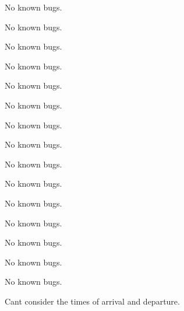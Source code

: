 
\begin{DoxyRefList}
\item[File \mbox{\hyperlink{airline_8c}{airline.c}} ]\label{bug__bug000001}%
%
No known bugs.  
\item[File \mbox{\hyperlink{airline_8h}{airline.h}} ]\label{bug__bug000002}%
%
No known bugs.  
\item[File \mbox{\hyperlink{airport_8c}{airport.c}} ]\label{bug__bug000003}%
%
No known bugs.  
\item[File \mbox{\hyperlink{airport_8h}{airport.h}} ]\label{bug__bug000004}%
%
No known bugs.  
\item[File \mbox{\hyperlink{flight_8c}{flight.c}} ]\label{bug__bug000005}%
%
No known bugs.  
\item[File \mbox{\hyperlink{flight_8h}{flight.h}} ]\label{bug__bug000006}%
%
No known bugs.  
\item[File \mbox{\hyperlink{list_8h}{list.h}} ]\label{bug__bug000007}%
%
No known bugs.  
\item[File \mbox{\hyperlink{listArrayList_8c}{list\+Array\+List.c}} ]\label{bug__bug000008}%
%
No known bugs.  
\item[File \mbox{\hyperlink{map_8h}{map.h}} ]\label{bug__bug000009}%
%
No known bugs.  
\item[File \mbox{\hyperlink{mapArrayList_8c}{map\+Array\+List.c}} ]\label{bug__bug000010}%
%
No known bugs.  
\item[File \mbox{\hyperlink{mapElem_8c}{map\+Elem.c}} ]\label{bug__bug000011}%
%
No known bugs.  
\item[File \mbox{\hyperlink{mapElem_8h}{map\+Elem.h}} ]\label{bug__bug000012}%
%
No known bugs.  
\item[File \mbox{\hyperlink{mapLinkedList_8c}{map\+Linked\+List.c}} ]\label{bug__bug000013}%
%
No known bugs.  
\item[File \mbox{\hyperlink{projectMethods_8c}{project\+Methods.c}} ]\label{bug__bug000014}%
%
No known bugs.  
\item[File \mbox{\hyperlink{projectMethods_8h}{project\+Methods.h}} ]\label{bug__bug000015}%
%
No known bugs.  
\item[Member \mbox{\hyperlink{projectMethods_8h_a4f42480a5225b2a35ff7cce08c22e1df}{tsp}} (Pt\+List flights, Pt\+Map airports, int number)]\label{bug__bug000016}%
%
Can\textquotesingle{}t consider the times of arrival and departure. 
\end{DoxyRefList}